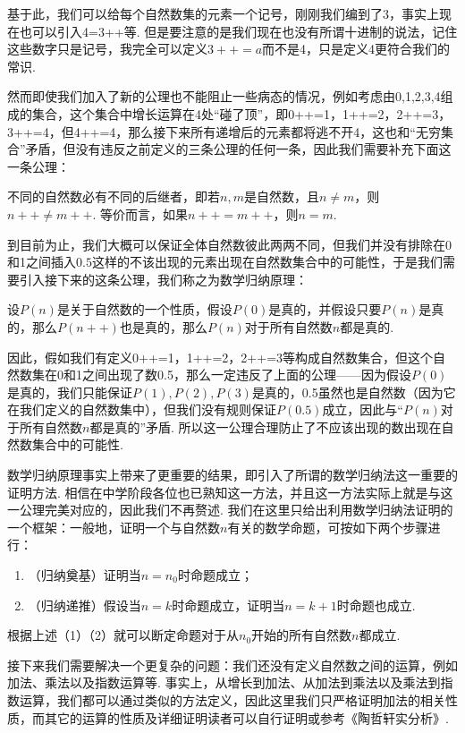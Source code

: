 基于此，我们可以给每个自然数集的元素一个记号，刚刚我们编到了3，事实上现在也可以引入4=3++等. 但是要注意的是我们现在也没有所谓十进制的说法，记住这些数字只是记号，我完全可以定义$3++=a$而不是4，只是定义4更符合我们的常识.

然而即使我们加入了新的公理也不能阻止一些病态的情况，例如考虑由0,1,2,3,4组成的集合，这个集合中增长运算在4处``碰了顶''，即0++=1，1++=2，2++=3，3++=4，但4++=4，那么接下来所有递增后的元素都将逃不开4，这也和``无穷集合''矛盾，但没有违反之前定义的三条公理的任何一条，因此我们需要补充下面这一条公理：

\begin{axiom*}
    不同的自然数必有不同的后继者，即若$n,m$是自然数，且$n\neq m$，则$n++\neq m++$. 等价而言，如果$n++=m++$，则$n=m$.
\end{axiom*}

到目前为止，我们大概可以保证全体自然数彼此两两不同，但我们并没有排除在0和1之间插入$0.5$这样的不该出现的元素出现在自然数集合中的可能性，于是我们需要引入接下来的这条公理，我们称之为数学归纳原理：

\begin{axiom*}
    设$P(n)$是关于自然数的一个性质，假设$P(0)$是真的，并假设只要$P(n)$是真的，那么$P(n++)$也是真的，那么$P(n)$对于所有自然数$n$都是真的.
\end{axiom*}

因此，假如我们有定义0++=1，1++=2，2++=3等构成自然数集合，但这个自然数集在0和1之间出现了数0.5，那么一定违反了上面的公理——因为假设$P(0)$是真的，我们只能保证$P(1),P(2),P(3)$是真的，0.5虽然也是自然数（因为它在我们定义的自然数集中），但我们没有规则保证$P(0.5)$成立，因此与``$P(n)$对于所有自然数$n$都是真的''矛盾. 所以这一公理合理防止了不应该出现的数出现在自然数集合中的可能性.

数学归纳原理事实上带来了更重要的结果，即引入了所谓的数学归纳法这一重要的证明方法. 相信在中学阶段各位也已熟知这一方法，并且这一方法实际上就是与这一公理完美对应的，因此我们不再赘述. 我们在这里只给出利用数学归纳法证明的一个框架：一般地，证明一个与自然数$n$有关的数学命题，可按如下两个步骤进行：
\begin{enumerate}
    \item（归纳奠基）证明当$n=n_0$时命题成立；
    \item（归纳递推）假设当$n=k$时命题成立，证明当$n=k+1$时命题也成立.
\end{enumerate}
根据上述（1）（2）就可以断定命题对于从$n_0$开始的所有自然数$n$都成立.

接下来我们需要解决一个更复杂的问题：我们还没有定义自然数之间的运算，例如加法、乘法以及指数运算等. 事实上，从增长到加法、从加法到乘法以及乘法到指数运算，我们都可以通过类似的方法定义，因此这里我们只严格证明加法的相关性质，而其它的运算的性质及详细证明读者可以自行证明或参考《陶哲轩实分析》.

